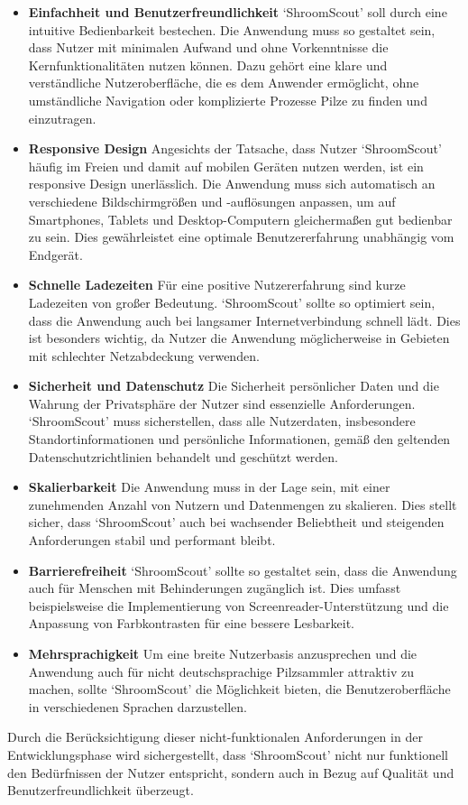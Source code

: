 \documentclass[../main.tex]{subfiles} %
\begin{document}
\begin{itemize}

	\item \textbf{Einfachheit und Benutzerfreundlichkeit}
	      `ShroomScout' soll durch eine intuitive Bedienbarkeit bestechen. Die Anwendung muss so gestaltet sein, dass Nutzer mit
	      minimalen Aufwand und ohne Vorkenntnisse die Kernfunktionalitäten nutzen können. Dazu gehört eine klare und verständliche
	      Nutzeroberfläche, die es dem Anwender ermöglicht, ohne umständliche Navigation oder komplizierte Prozesse Pilze zu finden
	      und einzutragen.

	\item \textbf{Responsive Design}
	      Angesichts der Tatsache, dass Nutzer `ShroomScout' häufig im Freien und damit auf mobilen Geräten nutzen werden, ist ein
	      responsive Design unerlässlich. Die Anwendung muss sich automatisch an verschiedene Bildschirmgrößen und -auflösungen
	      anpassen, um auf Smartphones, Tablets und Desktop-Computern gleichermaßen gut bedienbar zu sein. Dies gewährleistet eine
	      optimale Benutzererfahrung unabhängig vom Endgerät.

	\item \textbf{Schnelle Ladezeiten}
	      Für eine positive Nutzererfahrung sind kurze Ladezeiten von großer Bedeutung. `ShroomScout' sollte so optimiert sein,
	      dass die Anwendung auch bei langsamer Internetverbindung schnell lädt. Dies ist besonders wichtig, da Nutzer die Anwendung
	      möglicherweise in Gebieten mit schlechter Netzabdeckung verwenden.

	\item \textbf{Sicherheit und Datenschutz}
	      Die Sicherheit persönlicher Daten und die Wahrung der Privatsphäre der Nutzer sind essenzielle Anforderungen. `ShroomScout'
	      muss sicherstellen, dass alle Nutzerdaten, insbesondere Standortinformationen und persönliche Informationen, gemäß den
	      geltenden Datenschutzrichtlinien behandelt und geschützt werden.

	\item \textbf{Skalierbarkeit}
	      Die Anwendung muss in der Lage sein, mit einer zunehmenden Anzahl von Nutzern und Datenmengen zu skalieren. Dies stellt
	      sicher, dass `ShroomScout' auch bei wachsender Beliebtheit und steigenden Anforderungen stabil und performant bleibt.

	\item \textbf{Barrierefreiheit}
	      `ShroomScout' sollte so gestaltet sein, dass die Anwendung auch für Menschen mit Behinderungen zugänglich ist. Dies
	      umfasst beispielsweise die Implementierung von Screenreader-Unterstützung und die Anpassung von Farbkontrasten für eine
	      bessere Lesbarkeit.

	\item \textbf{Mehrsprachigkeit}
	      Um eine breite Nutzerbasis anzusprechen und die Anwendung auch für nicht deutschsprachige Pilzsammler attraktiv zu machen,
	      sollte `ShroomScout' die Möglichkeit bieten, die Benutzeroberfläche in verschiedenen Sprachen darzustellen.

\end{itemize}

Durch die Berücksichtigung dieser nicht-funktionalen Anforderungen in der Entwicklungsphase wird sichergestellt, dass `ShroomScout'
nicht nur funktionell den Bedürfnissen der Nutzer entspricht, sondern auch in Bezug auf Qualität und Benutzerfreundlichkeit überzeugt.
\end{document}

